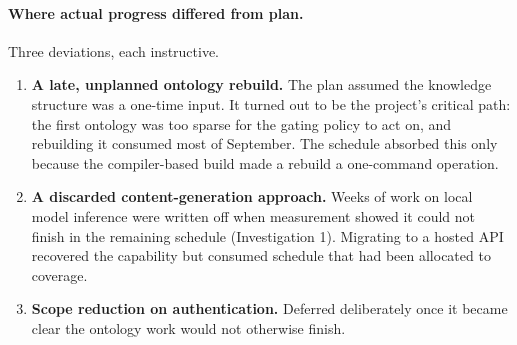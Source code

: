 

\paragraph{Where actual progress differed from plan.} Three deviations, each
instructive.

\begin{enumerate}
  \item \textbf{A late, unplanned ontology rebuild.} The plan assumed the
    knowledge structure was a one-time input. It turned out to be the project's
    critical path: the first ontology was too sparse for the gating policy to
    act on, and rebuilding it consumed most of September. The schedule absorbed
    this only because the compiler-based build made a rebuild a one-command
    operation.
  \item \textbf{A discarded content-generation approach.} Weeks of work on local
    model inference were written off when measurement showed it could not finish
    in the remaining schedule (Investigation 1). Migrating to a hosted API
    recovered the capability but consumed schedule that had been allocated to
    coverage.
  \item \textbf{Scope reduction on authentication.} Deferred deliberately once
    it became clear the ontology work would not otherwise finish.
\end{enumerate}

